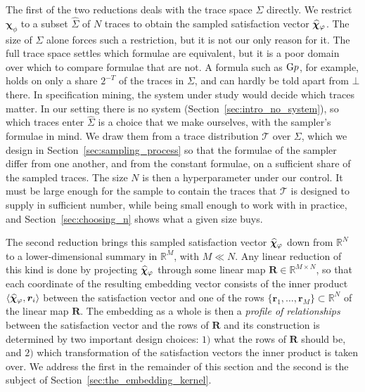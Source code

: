 \documentclass[titlepage,a4paper,11pt]{report}
\newenvironment{RSnewblock}{\par\color{blue!65!black}}{\par}
\begin{document}
    \begin{RSnewblock}
    The first of the two reductions deals with the trace space $\Sigma$ directly. We restrict $\bm\chi_\phi$ to a subset $\widehat\Sigma$ of $N$ traces to obtain the sampled satisfaction vector $\bm{\widehat\chi}_\varphi$. The size of $\Sigma$ alone forces such a restriction, but it is not our only reason for it. The full trace space settles which formulae are equivalent, but it is a poor domain over which to compare formulae that are not. A formula such as $\text{G} p$, for example, holds on only a share $2^{-T}$ of the traces in $\Sigma$, and can hardly be told apart from $\bot$ there. In specification mining, the system under study would decide which traces matter. In our setting there is no system (Section~\ref{sec:intro_no_system}), so which traces enter $\widehat\Sigma$ is a choice that we make ourselves, with the sampler's formulae in mind. We draw them from a trace distribution $\mathcal T$ over $\Sigma$, which we design in Section~\ref{sec:sampling_process} so that the formulae of the sampler differ from one another, and from the constant formulae, on a sufficient share of the sampled traces. The size $N$ is then a hyperparameter under our control. It must be large enough for the sample to contain the traces that $\mathcal T$ is designed to supply in sufficient number, while being small enough to work with in practice, and Section~\ref{sec:choosing_n} shows what a given size buys.
    \end{RSnewblock}

    The second reduction brings this sampled satisfaction vector $\bm{\widehat\chi}_\varphi$ down from $\mathbb{R}^N$ to a lower-dimensional summary in $\mathbb{R}^M$, with $M \ll N$. Any linear reduction of this kind is done by projecting $\bm{\widehat\chi}_\varphi$ through some linear map $\bm R \in \mathbb{R}^{M\times N}$, so that each coordinate of the resulting embedding vector consists of the inner product $\langle \bm{\widehat\chi}_\varphi , \bm r_i\rangle$ between the satisfaction vector and one of the rows $\{\bm r_1, \dots, \bm r_M\} \subset \mathbb{R}^N$ of the linear map $\bm R$. The embedding as a whole is then a \emph{profile of relationships} between the satisfaction vector and the rows of $\bm R$ and its construction is determined by two important design choices: $1)$ what the rows of $\bm R$ should be, and $2)$ which transformation of the satisfaction vectors the inner product is taken over. We address the first in the remainder of this section and the second is the subject of Section~\ref{sec:the_embedding_kernel}.
\end{document}
